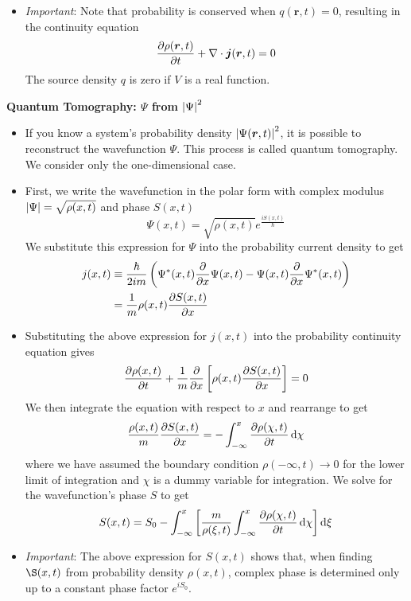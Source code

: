 \documentclass[11pt, a4paper]{article}
\newcommand{\diff}{\mathop{}\!\mathrm{d}} %
\renewcommand{\div}{\nabla \cdot}
\renewcommand{\vec}[1]{\bm{#1}}  %
\renewcommand{\r}{\vec{r}}  %
\renewcommand{\P}{\Psi}  %
\begin{document}
\begin{itemize}
	\item \textit{Important}: Note that probability is conserved when $ q(\r, t) = 0$, resulting in the continuity equation
	\begin{equation*}
		\pdv{\rho(\r, t)}{t} + \div \vec{j}(\r, t) = 0
	\end{equation*}
	The source density $ q $ is zero if $ V $ is a real function.
	
\end{itemize}
\textbf{Quantum Tomography: $ \P $ from $ \abs{\P}^{2} $}
\begin{itemize}
	\item If you know a system's probability density $\abs{\P(\r, t)}^{2} $, it is possible to reconstruct the wavefunction $ \P $. This process is called quantum tomography. We consider only the one-dimensional case. 
	
	\item First, we write the wavefunction in the polar form with complex modulus $ \abs{\P} = \sqrt{\rho(x, t)} $ and phase $ S(x, t) $
	\begin{equation*}
		\P(x, t) = \sqrt{\rho(x, t)}e^{\frac{iS(x, t)}{\hbar}}
	\end{equation*}
	We substitute this expression for $ \P $ into the probability current density to get
	\begin{align*}
		j(x, t) &\equiv \frac{\hbar}{2im}\left(\P^{*}(x, t)\pdv{x}\P(x, t) - \P(x, t)\pdv{x}\P^{*}(x, t)\right) \\
		& = \frac{1}{m} \rho(x, t)\pdv{S(x, t)}{x}
	\end{align*}
	
	\item Substituting the above expression for $ j(x, t) $ into the probability continuity equation gives
	\begin{equation*}
		\pdv{\rho(x, t)}{t} + \frac{1}{m}\pdv{x}\left[\rho(x, t) \pdv{S(x, t)}{x}\right] = 0
	\end{equation*}
	We then integrate the equation with respect to $ x $ and rearrange to get
	\begin{equation*}
		\frac{\rho(x, t)}{m} \pdv{S(x, t)}{x} = - \int_{-\infty}^{x} \pdv{\rho(\chi, t)}{t}\diff \chi
	\end{equation*}
	where we have assumed the boundary condition $ \rho(-\infty, t) \to 0 $ for the lower limit of integration and $ \chi $ is a dummy variable for integration. We solve for the wavefunction's phase $ S $ to get
	\begin{equation*}
		S(x, t) = S_{0} - \int_{-\infty}^{x} \left[ \frac{m}{\rho(\xi, t)} \int_{-\infty}^{x} \pdv{\rho(\chi, t)}{t}\diff \chi\right] \diff \xi
	\end{equation*}
	
	\item \textit{Important}: The above expression for $ S(x, t) $ shows that, when finding $ \S(x, t) $ from probability density $ \rho(x, t) $, complex phase is determined only up to a constant phase factor $ e^{iS_{0}} $.
\end{itemize}
\end{document}
